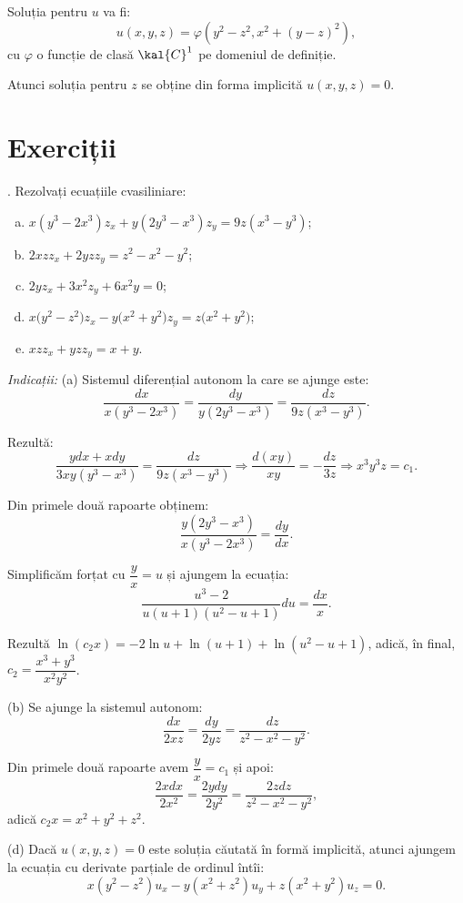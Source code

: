 Soluția pentru $ u $ va fi:
\[
  u(x, y, z) = \varphi(y^2 - z^2, x^2 + (y - z)^2),
\]
cu $ \varphi $ o funcție de clasă $ \kal{C}^1 $ pe domeniul de definiție.

Atunci soluția pentru $ z $ se obține din forma implicită $ u(x, y, z) = 0 $.



\section{Exerciții}

\indent{}. Rezolvați ecuațiile cvasiliniare:
\begin{enumerate}[(a)]
\item $x(y^3 - 2x^3)z_x + y(2y^3 - x^3)z_y = 9z(x^3 - y^3) $;
\item $ 2xzz_x + 2yzz_y = z^2 - x^2 - y^2 $;
\item $ 2y z_x + 3x^2 z_y + 6x^2 y = 0 $;
\item $ x \Big( y^2 - z^2 \Big) z_x - y \Big( x^2 + y^2 \Big) z_y = z \Big( x^2 + y^2 \Big) $;
\item $ xz z_x + yz z_y = x + y $.
\end{enumerate}

\emph{Indicații:} (a) Sistemul diferențial autonom la care se ajunge este:
\[
  \dfrac{dx}{x(y^3 - 2x^3)} = \dfrac{dy}{y(2y^3 - x^3)} = \dfrac{dz}{9z(x^3 - y^3)}.
\]

Rezultă:
\[
  \dfrac{ydx + xdy}{3xy(y^3 - x^3)} = \dfrac{dz}{9z(x^3 - y^3)} \Rightarrow %
  \dfrac{d(xy)}{xy} = -\dfrac{dz}{3z} \Rightarrow x^3 y^3 z = c_1.
\]

Din primele două rapoarte obținem:
\[
  \dfrac{y(2y^3 - x^3)}{x(y^3 - 2x^3)} = \dfrac{dy}{dx}.
\]

Simplificăm forțat cu $ \dfrac{y}{x} = u $ și ajungem la ecuația:
\[
  \dfrac{u^3 - 2}{u(u+1)(u^2 - u + 1)} du = \dfrac{dx}{x}.
\]

Rezultă $ \ln(c_2 x) = -2\ln u + \ln(u + 1) + \ln(u^2 - u + 1) $, adică, în final,
$ c_2 = \dfrac{x^3 + y^3}{x^2 y^2} $.

(b) Se ajunge la sistemul autonom:
\[
  \dfrac{dx}{2xz} = \dfrac{dy}{2yz} = \dfrac{dz}{z^2 - x^2 - y^2}.
\]

Din primele două rapoarte avem $ \dfrac{y}{x} = c_1 $ și apoi:
\[
  \dfrac{2xdx}{2x^2} = \dfrac{2ydy}{2y^2} = \dfrac{2zdz}{z^2 - x^2 - y^2},
\]
adică $ c_2x = x^2 + y^2 + z^2 $.

(d) Dacă $ u(x, y, z) = 0 $ este soluția căutată în formă implicită, atunci ajungem
la ecuația cu derivate parțiale de ordinul întîi:
\[
  x(y^2 - z^2)u_x - y(x^2 + z^2) u_y + z(x^2 + y^2) u_z = 0.
\]

